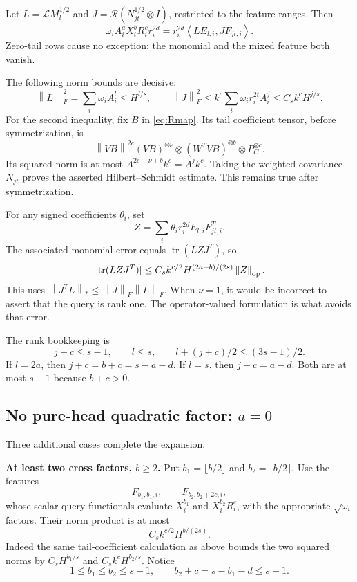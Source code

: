 \documentclass[11pt]{article}
\theoremstyle{remark}\newtheorem{remark}[theorem]{Remark}
\newcommand{\tr}{\operatorname{tr}}\newcommand{\rank}{\operatorname{rank}}
\newcommand{\norm}[1]{\left\|#1\right\|}\newcommand{\ip}[2]{\left\langle #1,#2\right\rangle}
\begin{document}
Let $L=\mathcal L M_l^{1/2}$ and $J=\mathcal R(N_{jt}^{1/2}\otimes I)$, restricted to the feature ranges. Then
\begin{equation}\label{eq:op-factor}
 \omega_i A_i^aX_i^bR_i^cr_i^{2d}
 =r_i^{2d}\ip{L E_{l,i}}{J F_{jt,i}}.
\end{equation}
Zero-tail rows cause no exception: the monomial and the mixed feature both vanish.

The following norm bounds are decisive:
\begin{equation}\label{eq:query-maps}
 \norm L_F^2=\sum_i\omega_iA_i^l\le H^{l/s},\qquad
 \norm J_F^2\le k^c\sum_i\omega_i r_i^{2t}A_i^j\le C_s k^cH^{j/s}.
\end{equation}
For the second inequality, fix $B$ in \eqref{eq:Rmap}. Its tail coefficient tensor, before symmetrization, is
\[
 \norm{VB}^{2e}(VB)^{\otimes\nu}\otimes(W^TVB)^{\otimes b}\otimes P_C^{\otimes c}.
\]
Its squared norm is at most $A^{2e+\nu+b}k^c=A^jk^c$. Taking the weighted covariance $N_{jt}$ proves the asserted Hilbert--Schmidt estimate. This remains true after symmetrization.

For any signed coefficients $\theta_i$, set
\[
 Z=\sum_i\theta_i r_i^{2d}E_{l,i}F_{jt,i}^T.
\]
The associated monomial error equals $\tr(LZJ^T)$, so
\begin{equation}\label{eq:op-query}
 |\tr(LZJ^T)|\le C_s k^{c/2}H^{(2a+b)/(2s)}\norm Z_{\op}.
\end{equation}
This uses $\norm{J^TL}_*\le\norm J_F\norm L_F$. When $\nu=1$, it would be incorrect to assert that the query is rank one. The operator-valued formulation is what avoids that error.

The rank bookkeeping is
\begin{equation}\label{eq:rank-book}
 j+c\le s-1,\qquad l\le s,\qquad l+(j+c)/2\le(3s-1)/2.
\end{equation}
If $l=2a$, then $j+c=b+c=s-a-d$. If $l=s$, then $j+c=a-d$. Both are at most $s-1$ because $b+c>0$.

\subsection[No pure-head quadratic factor]{No pure-head quadratic factor: $a=0$}
Three additional cases complete the expansion.

\textbf{At least two cross factors, $b\ge2$.} Put $b_1=\lfloor b/2\rfloor$ and $b_2=\lceil b/2\rceil$. Use the features
\[
 F_{b_1,b_1,i},\qquad F_{b_2,b_2+2c,i},
\]
whose scalar query functionals evaluate $X_i^{b_1}$ and $X_i^{b_2}R_i^c$, with the appropriate $\sqrt{\omega_i}$ factors. Their norm product is at most
\begin{equation}\label{eq:balanced-query}
 C_s k^{c/2}H^{b/(2s)}.
\end{equation}
Indeed the same tail-coefficient calculation as above bounds the two squared norms by $C_sH^{b_1/s}$ and $C_s k^cH^{b_2/s}$. Notice
\begin{equation}\label{eq:balanced-rank}
 1\le b_1\le b_2\le s-1,\qquad b_2+c=s-b_1-d\le s-1.
\end{equation}
\end{document}
